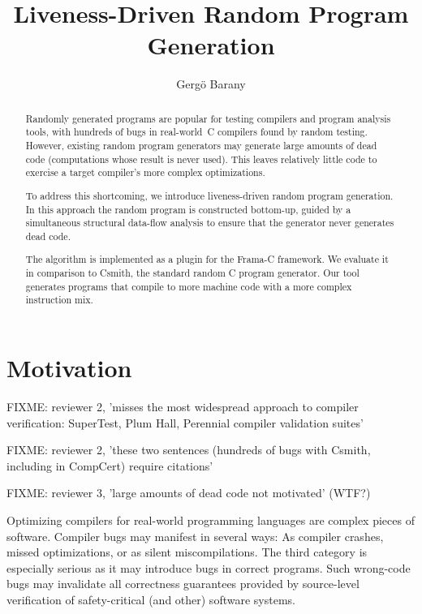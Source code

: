 \documentclass{llncs}
\title{Liveness-Driven Random Program Generation}
\author{Gergö Barany}
\institute{Inria Paris, Paris, France \\
           \email{gergo.barany@inria.fr}}
\begin{document}
\maketitle
\thispagestyle{plain}

\begin{abstract}
Randomly generated programs are popular for testing compilers and program
analysis tools, with hundreds of bugs in real-world~C compilers found by
random testing. However, existing random program generators may generate
large amounts of dead code (computations whose result is never used). This
leaves relatively little code to exercise a target compiler's more complex
optimizations.

To address this shortcoming, we introduce liveness-driven random program
generation. In this approach the random program is constructed bottom-up,
guided by a simultaneous structural data-flow analysis to ensure that the
generator never generates dead code.

The algorithm is implemented as a plugin for the Frama-C framework. We
evaluate it in comparison to Csmith, the standard random C program
generator. Our tool generates programs that compile to more machine code
with a more complex instruction mix.
\end{abstract}



\section{Motivation}

FIXME: reviewer 2, 'misses the most widespread approach to compiler
verification: SuperTest, Plum Hall, Perennial compiler validation suites'

FIXME: reviewer 2, 'these two sentences (hundreds of bugs with Csmith,
including in CompCert) require citations'

FIXME: reviewer 3, 'large amounts of dead code not motivated' (WTF?)

Optimizing compilers for real-world programming languages are complex pieces
of software. Compiler bugs may manifest in several ways: As compiler
crashes, missed optimizations, or as silent miscompilations. The third
category is especially serious as it may introduce bugs in correct programs.
Such wrong-code bugs may invalidate all correctness guarantees provided by
source-level verification of safety-critical (and other) software systems.
\end{document}
